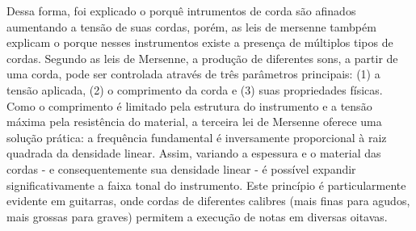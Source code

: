 Dessa forma, foi explicado o porquê intrumentos de corda são afinados aumentando a tensão de suas cordas, porém, as leis de mersenne tambpém explicam o porque nesses instrumentos existe a presença de múltiplos tipos de cordas. Segundo as leis de Mersenne, a produção de diferentes sons, a partir de uma corda, pode ser controlada através de três parâmetros principais: (1) a tensão aplicada, (2) o comprimento da corda e (3) suas propriedades físicas. Como o comprimento é limitado pela estrutura do instrumento e a tensão máxima pela resistência do material, a terceira lei de Mersenne oferece uma solução prática: a frequência fundamental é inversamente proporcional à raiz quadrada da densidade linear. Assim, variando a espessura e o material das cordas - e consequentemente sua densidade linear - é possível expandir significativamente a faixa tonal do instrumento. Este princípio é particularmente evidente em guitarras, onde cordas de diferentes calibres (mais finas para agudos, mais grossas para graves) permitem a execução de notas em diversas oitavas.
